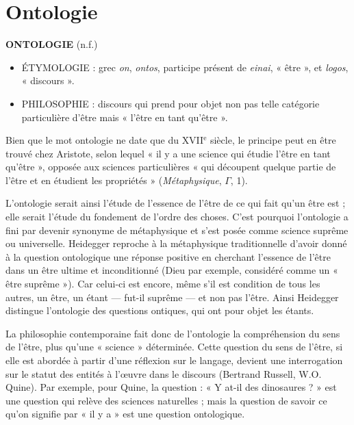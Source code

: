 
\chapter{Ontologie}

{\bf O{\footnotesize NTOLOGIE}} (n.f.)

\begin{itemize}[leftmargin=1cm, label=, itemsep=1pt]
\item {\footnotesize ÉTYMOLOGIE} : grec {\it on}, {\it ontos}, participe présent de {\it einai}, « être », et
{\it logos}, « discours ».
\item {\footnotesize PHILOSOPHIE} : discours qui prend pour objet non
pas telle catégorie particulière d’être
mais « l'être en tant qu'être ».
\end{itemize}

Bien que le mot ontologie ne date que
du {\footnotesize XVII}$^\text{e}$ siècle, le principe peut en être
trouvé chez Aristote, selon lequel « il y
a une science qui étudie l'être en tant
qu'être », opposée aux sciences particulières « qui
découpent quelque partie de
l'être et en étudient les propriétés »
({\it Métaphysique}, $\Gamma$, 1).

L'ontologie serait ainsi l'étude de l’essence de l’être
de ce qui fait qu'un être
est ; elle serait l'étude du fondement de
l'ordre des choses. C’est pourquoi l’ontologie a fini par devenir synonyme de
métaphysique et s'est posée comme
science suprême ou universelle.
Heidegger reproche à la métaphysique
traditionnelle d’avoir donné à la question ontologique une réponse positive
en cherchant l'essence de l'être dans un
être ultime et inconditionné (Dieu par
exemple, considéré comme un « être
suprême »). Car celui-ci est encore,
même s'il est condition de tous les
autres, un être, un étant — fut-il
suprême — et non pas l'être. Ainsi Heidegger distingue
l’ontologie des questions ontiques, qui ont pour objet les
étants.

La philosophie contemporaine fait donc
de l’ontologie la compréhension du sens
de l’être, plus qu'une « science » déterminée. Cette
question du sens de l'être,
si elle est abordée à partir d'une
réflexion sur le langage, devient une
interrogation sur le statut des entités à
l'œuvre dans le discours (Bertrand Russell, W.O. Quine).
Par exemple, pour
Quine, la question : « Y at-il des dinosaures ? »
est une question qui relève des
sciences naturelles ; mais la question de
savoir ce qu'on signifie par « il y a » est
une question ontologique.

